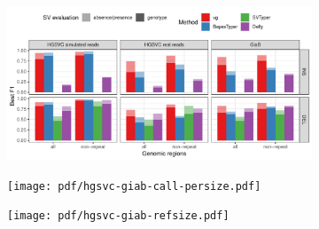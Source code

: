 \documentclass{article}
\begin{document}
\clearpage
\begin{figure}
  \begin{subfigure}[b]{\textwidth}
    \caption{}
    \includegraphics[width=\textwidth]{pdf/hgsvc-giab-best-f1.pdf}
  \end{subfigure}

  \begin{subfigure}[b]{\textwidth}
    \caption{}
    \texttt{[image: pdf/hgsvc-giab-call-persize.pdf]}
  \end{subfigure}

  \begin{subfigure}[b]{\textwidth}
    \caption{}
    \texttt{[image: pdf/hgsvc-giab-refsize.pdf]}
  \end{subfigure}
\end{figure}
\end{document}
